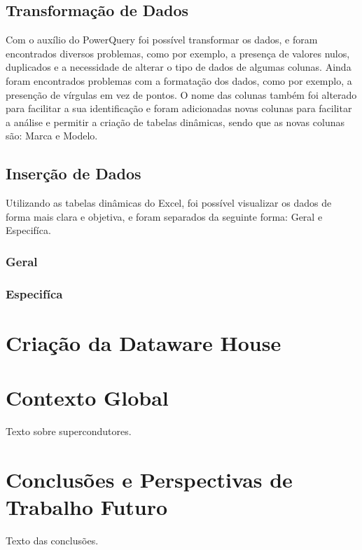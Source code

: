 \documentclass[a4paper]{article}
\begin{document}
\subsection{Transformação de Dados}
Com o auxílio do PowerQuery foi possível transformar os dados, e foram encontrados diversos problemas,
como por exemplo, a presença de valores nulos, duplicados e a necessidade de alterar o tipo de dados de algumas colunas.
Ainda foram encontrados problemas com a formatação dos dados, como por exemplo, a presenção de vírgulas em vez de pontos.
O nome das colunas também foi alterado para facilitar a sua identificação e foram adicionadas novas colunas para facilitar a análise
e permitir a criação de tabelas dinâmicas, sendo que as novas colunas são: Marca e Modelo.

\subsection{Inserção de Dados}
Utilizando as tabelas dinâmicas do Excel, foi possível visualizar os dados de forma mais clara e objetiva, e foram separados da seguinte
forma: Geral e Especifíca.

\subsubsection{Geral}

\subsubsection{Especifíca}


\section{Criação da Dataware House}\label{dwh}



\section{Contexto Global}\label{cg}
Texto sobre supercondutores.


\section{Conclusões e Perspectivas de Trabalho Futuro}\label{con}
Texto das conclusões.

\newpage
\renewcommand{\refname}{Bibliografia} %
\renewcommand{\bibname}{Bibliografia} %
\printbibliography
\end{document}

